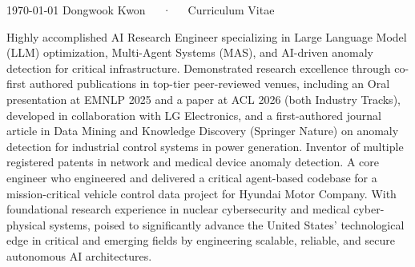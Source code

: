 \documentclass[11pt, letterpaper]{awesome-cv}
\begin{document}
\raggedbottom

\makecvheader[C]
\makecvfooter
  {\today}
  {Dongwook Kwon~~~·~~~Curriculum Vitae}
  {\thepage}



\begin{cvparagraph}

Highly accomplished AI Research Engineer specializing in Large Language Model (LLM) optimization, Multi-Agent Systems (MAS), and AI-driven anomaly detection for critical infrastructure. Demonstrated research excellence through co-first authored publications in top-tier peer-reviewed venues, including an Oral presentation at EMNLP 2025 and a paper at ACL 2026 (both Industry Tracks), developed in collaboration with LG Electronics, and a first-authored journal article in Data Mining and Knowledge Discovery (Springer Nature) on anomaly detection for industrial control systems in power generation. Inventor of multiple registered patents in network and medical device anomaly detection. A core engineer who engineered and delivered a critical agent-based codebase for a mission-critical vehicle control data project for Hyundai Motor Company. With foundational research experience in nuclear cybersecurity and medical cyber-physical systems, poised to significantly advance the United States' technological edge in critical and emerging fields by engineering scalable, reliable, and secure autonomous AI architectures.
\end{cvparagraph}


\begin{cvhonors}
\end{cvhonors}

\begin{cvhonors}
\end{cvhonors}
\end{document}
